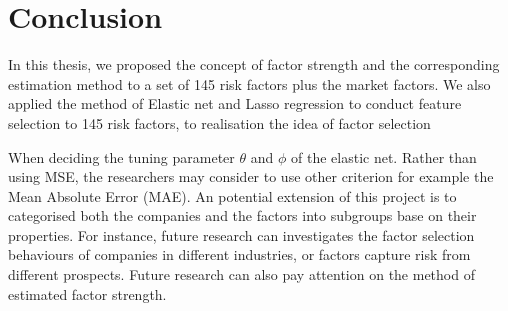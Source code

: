 	\section{Conclusion}\label{Conclusion}
In this thesis, we proposed the concept of factor strength and the corresponding estimation method to a set of 145 risk factors plus the market factors.
We also applied the method of Elastic net and Lasso regression to conduct feature selection to 145 risk factors, to realisation the idea of factor selection 



When deciding the tuning parameter $\theta$ and $\phi$ of the elastic net.
Rather than using MSE, the researchers may consider to use other criterion for example the Mean Absolute Error (MAE).
An potential extension of this project is to categorised both the companies and the factors into subgroups base on their properties.
For instance, future research can investigates the factor selection behaviours of companies in different industries, or factors capture risk from different prospects.
Future research can also pay attention on the method of estimated factor strength.
